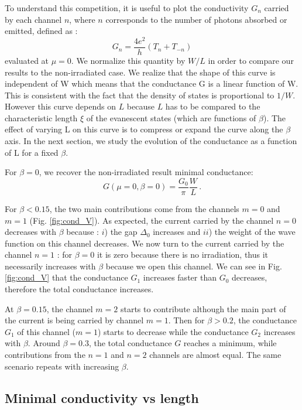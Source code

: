 \documentclass[aps,prb,showpacs,superscriptaddress,twocolumn,10pt,floatfix]{revtex4-1}
\begin{document}
To understand this competition, it is useful to plot the conductivity $G_{n}$ carried by each channel $n$, where $n$ corresponds to the number of photons absorbed or emitted, defined as : 
\begin{equation}
G_n=\frac{4e^2}{h}(T_n+T_{-n})
\label{eq:cond_m}
\end{equation}
evaluated at $\mu=0$. We normalize this quantity by $W/L$ in order to compare our results to the non-irradiated case. We realize that the shape of this curve is independent of W which means that the conductance G is a linear function of W. This is consistent with the fact that the density of states is proportional to $1/W$. However this curve depends on $L$ because $L$ has to be compared to the characteristic length $\xi$ of the evanescent states (which are functions of $\beta$). The effect of varying L on this curve is to compress or expand the curve along the $\beta$ axis. In the next section, we study the evolution of the conductance as a function of L for a fixed $\beta$.

For $\beta=0$, we recover the non-irradiated result minimal conductance:
\begin{equation}
G(\mu=0,\beta=0)=\frac{G_0}{\pi}\frac{W}{L} \, .
 \end{equation}

For $\beta<0.15$, the two main contributions come from the channels $m=0$ and $m=1$ (Fig. \ref{fig:cond_V}). As expected, the current carried by the channel $n=0$ decreases with $\beta$ because : $i$) the gap $\Delta_0$ increases and $ii$) the weight of the wave function on this channel decreases. We now turn to the current carried by the channel $n=1$ : for $\beta=0$ it is zero because there is no irradiation, thus it necessarily increases with $\beta$ because we open this channel. We can see in Fig. \ref{fig:cond_V} that the conductance $G_1$ increases faster than $G_0$ decreases, therefore the total conductance increases.

At $\beta=0.15$, the channel $m=2$ starts to contribute although the main part of the current is being carried by channel $m=1$. Then for $\beta>0.2$, the conductance $G_1$ of this channel ($m=1$) starts to decrease while the conductance $G_2$ increases with $\beta$. Around $\beta=0.3$, the total conductance $G$ reaches a minimum, while contributions from the $n=1$ and $n=2$ channels are almost equal. The same scenario repeats with increasing $\beta$.


\subsection{Minimal conductivity vs length}
\end{document}
